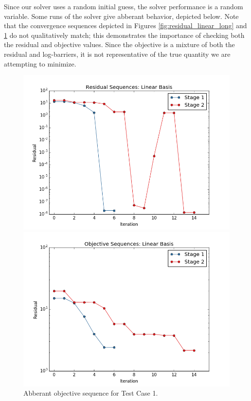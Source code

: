 \documentclass[]{aiaa-tc}%
\begin{document}
Since our solver uses a random initial guess, the solver performance is a random variable. Some runs of the solver give abberant behavior, depicted below. Note that the convergence sequences depicted in Figures \ref{fig:residual_linear_long} and \ref{fig:objective_linear_long} do not qualitatively match; this demonstrates the importance of checking both the residual and objective values. Since the objective is a mixture of both the residual and log-barriers, it is not representative of the true quantity we are attempting to minimize.

\begin{figure}[!ht]
\centering
\begin{minipage}{.50\textwidth}
 \centering
 \includegraphics[width=.8\textwidth]{../images/residual_linear_long}
 \caption{Abberant residual sequence for Test Case 1.}
 \label{fig:residual_linear_long}
\end{minipage}%
\begin{minipage}{.50\textwidth}
 \centering
 \includegraphics[width=.8\textwidth]{../images/objective_linear_long}
 \caption{Abberant objective sequence for Test Case 1.}
 \label{fig:objective_linear_long}
\end{minipage}
\end{figure}
\end{document}
